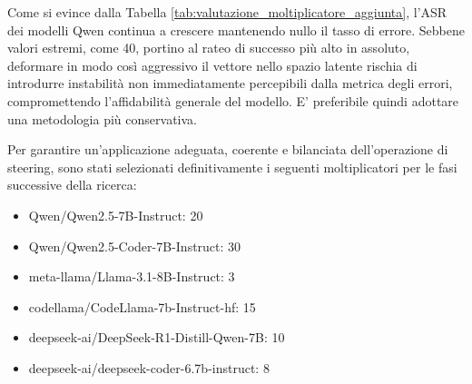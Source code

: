 \begin{table}[H]
    \centering
    \vspace{0.2cm}
    \caption{Ricerca del moltiplicatore aggiunta}
    \label{tab:valutazione_moltiplicatore_aggiunta}
\end{table}

Come si evince dalla Tabella \ref{tab:valutazione_moltiplicatore_aggiunta}, l'ASR dei modelli Qwen continua a crescere mantenendo nullo il tasso di errore. Sebbene valori estremi, come 40, portino al rateo di successo più alto in assoluto, deformare in modo così aggressivo il vettore nello spazio latente rischia di introdurre instabilità non immediatamente percepibili dalla metrica degli errori, compromettendo l'affidabilità generale del modello. E' preferibile quindi adottare una metodologia più conservativa.

Per garantire un'applicazione adeguata, coerente e bilanciata dell'operazione di steering, sono stati selezionati definitivamente i seguenti moltiplicatori per le fasi successive della ricerca:

\begin{itemize}[noitemsep]
    \item Qwen/Qwen2.5-7B-Instruct: 20
    \item Qwen/Qwen2.5-Coder-7B-Instruct: 30
    \item meta-llama/Llama-3.1-8B-Instruct: 3
    \item codellama/CodeLlama-7b-Instruct-hf: 15
    \item deepseek-ai/DeepSeek-R1-Distill-Qwen-7B: 10
    \item deepseek-ai/deepseek-coder-6.7b-instruct: 8
\end{itemize}

